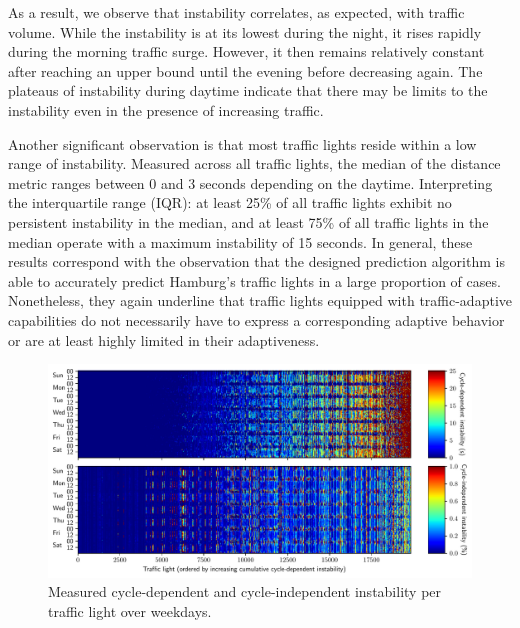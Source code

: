 As a result, we observe that instability correlates, as expected, with traffic volume. While the instability is at its lowest during the night, it rises rapidly during the morning traffic surge. However, it then remains relatively constant after reaching an upper bound until the evening before decreasing again. The plateaus of instability during daytime indicate that there may be limits to the instability even in the presence of increasing traffic. 

Another significant observation is that most traffic lights reside within a low range of instability. Measured across all traffic lights, the median of the distance metric ranges between 0 and 3 seconds depending on the daytime. Interpreting the interquartile range (IQR): at least 25\% of all traffic lights exhibit no persistent instability in the median, and at least 75\% of all traffic lights in the median operate with a maximum instability of 15 seconds. In general, these results correspond with the observation that the designed prediction algorithm is able to accurately predict Hamburg's traffic lights in a large proportion of cases. Nonetheless, they again underline that traffic lights equipped with traffic-adaptive capabilities do not necessarily have to express a corresponding adaptive behavior or are at least highly limited in their adaptiveness.

\begin{figure}[ht]
    \centering
    \includegraphics[width=\linewidth]{images/predictability-week-heatmap-per-thing.pdf}
    \caption{Measured cycle-dependent and cycle-independent instability per traffic light over weekdays.}\label{fig:adaptiveness-weekdays-comparison}
\end{figure}


